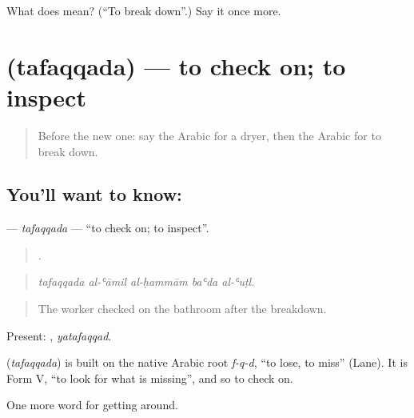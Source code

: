 \begin{tcolorbox}[breakable,colback=teal!4,colframe=teal!35!black,title={Before you move on}]
What does  mean? (\textquotedblleft{}To break down\textquotedblright{}.) Say it once more.
\end{tcolorbox}
\section[\texorpdfstring{\ar{تفقد} (tafaqqada)}{تفقد (tafaqqada)}]{ (tafaqqada) — to check on; to inspect}

\label{lesson:AR-C447-tafaqqada}



\begin{quote}
Before the new one: say the Arabic for a dryer, then the Arabic for to break down.
\end{quote}

\subsection*{You'll want to know: }
\textbf{} — \emph{tafaqqada} — \textquotedblleft{}to check on; to inspect\textquotedblright{}.

\begin{quote}
    .
\end{quote}

\begin{quote}
\emph{tafaqqada al-ʿāmil al-ḥammām baʿda al-ʿuṭl.}
\end{quote}

\begin{quote}
The worker checked on the bathroom after the breakdown.
\end{quote}

Present: , \emph{yatafaqqad}.

\begin{cousinweb}
\textbf{} (\emph{tafaqqada}) is built on the native Arabic root \emph{f-q-d}, \textquotedblleft{}to lose, to miss\textquotedblright{} (Lane). It is Form V, \textquotedblleft{}to look for what is missing\textquotedblright{}, and so to check on.
\end{cousinweb}

\begin{grammarlens}[title={What you've built}]
One more word for getting around.
\end{grammarlens}

